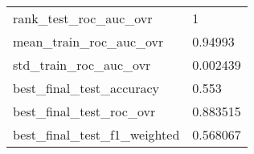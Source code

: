 \begin{tabular}{ll}
rank\_test\_roc\_auc\_ovr       &                                                  1 \\
mean\_train\_roc\_auc\_ovr      &                                            0.94993 \\
std\_train\_roc\_auc\_ovr       &                                           0.002439 \\
best\_final\_test\_accuracy    &                                              0.553 \\
best\_final\_test\_roc\_ovr     &                                           0.883515 \\
best\_final\_test\_f1\_weighted &                                           0.568067 \\
\bottomrule
\end{tabular}
